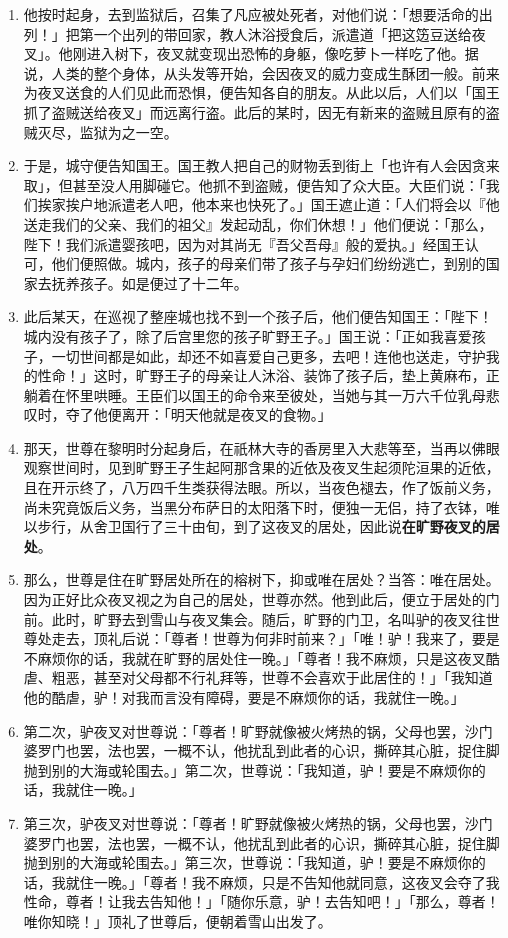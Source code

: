 \begin{enumerate}
\item 他按时起身，去到监狱后，召集了凡应被处死者，对他们说：「想要活命的出列！」把第一个出列的带回家，教人沐浴授食后，派遣道「把这笾豆送给夜叉」。他刚进入树下，夜叉就变现出恐怖的身躯，像吃萝卜一样吃了他。据说，人类的整个身体，从头发等开始，会因夜叉的威力变成生酥团一般。前来为夜叉送食的人们见此而恐惧，便告知各自的朋友。从此以后，人们以「国王抓了盗贼送给夜叉」而远离行盗。此后的某时，因无有新来的盗贼且原有的盗贼灭尽，监狱为之一空。
\item 于是，城守便告知国王。国王教人把自己的财物丢到街上「也许有人会因贪来取」，但甚至没人用脚碰它。他抓不到盗贼，便告知了众大臣。大臣们说：「我们挨家挨户地派遣老人吧，他本来也快死了。」国王遮止道：「人们将会以『他送走我们的父亲、我们的祖父』发起动乱，你们休想！」他们便说：「那么，陛下！我们派遣婴孩吧，因为对其尚无『吾父吾母』般的爱执。」经国王认可，他们便照做。城内，孩子的母亲们带了孩子与孕妇们纷纷逃亡，到别的国家去抚养孩子。如是便过了十二年。
\item 此后某天，在巡视了整座城也找不到一个孩子后，他们便告知国王：「陛下！城内没有孩子了，除了后宫里您的孩子旷野王子。」国王说：「正如我喜爱孩子，一切世间都是如此，却还不如喜爱自己更多，去吧！连他也送走，守护我的性命！」这时，旷野王子的母亲让人沐浴、装饰了孩子后，垫上黄麻布，正躺着在怀里哄睡。王臣们以国王的命令来至彼处，当她与其一万六千位乳母悲叹时，夺了他便离开：「明天他就是夜叉的食物。」
\item 那天，世尊在黎明时分起身后，在祇林大寺的香房里入大悲等至，当再以佛眼观察世间时，见到旷野王子生起阿那含果的近依及夜叉生起须陀洹果的近依，且在开示终了，八万四千生类获得法眼。所以，当夜色褪去，作了饭前义务，尚未究竟饭后义务，当黑分布萨日的太阳落下时，便独一无侣，持了衣钵，唯以步行，从舍卫国行了三十由旬，到了这夜叉的居处，因此说\textbf{在旷野夜叉的居处}。
\item 那么，世尊是住在旷野居处所在的榕树下，抑或唯在居处？当答：唯在居处。因为正好比众夜叉视之为自己的居处，世尊亦然。他到此后，便立于居处的门前。此时，旷野去到雪山与夜叉集会。随后，旷野的门卫，名叫驴的夜叉往世尊处走去，顶礼后说：「尊者！世尊为何非时前来？」「唯！驴！我来了，要是不麻烦你的话，我就在旷野的居处住一晚。」「尊者！我不麻烦，只是这夜叉酷虐、粗恶，甚至对父母都不行礼拜等，世尊不会喜欢于此居住的！」「我知道他的酷虐，驴！对我而言没有障碍，要是不麻烦你的话，我就住一晚。」
\item 第二次，驴夜叉对世尊说：「尊者！旷野就像被火烤热的锅，父母也罢，沙门婆罗门也罢，法也罢，一概不认，他扰乱到此者的心识，撕碎其心脏，捉住脚抛到别的大海或轮围去。」第二次，世尊说：「我知道，驴！要是不麻烦你的话，我就住一晚。」
\item 第三次，驴夜叉对世尊说：「尊者！旷野就像被火烤热的锅，父母也罢，沙门婆罗门也罢，法也罢，一概不认，他扰乱到此者的心识，撕碎其心脏，捉住脚抛到别的大海或轮围去。」第三次，世尊说：「我知道，驴！要是不麻烦你的话，我就住一晚。」「尊者！我不麻烦，只是不告知他就同意，这夜叉会夺了我性命，尊者！让我去告知他！」「随你乐意，驴！去告知吧！」「那么，尊者！唯你知晓！」顶礼了世尊后，便朝着雪山出发了。

\end{enumerate}
